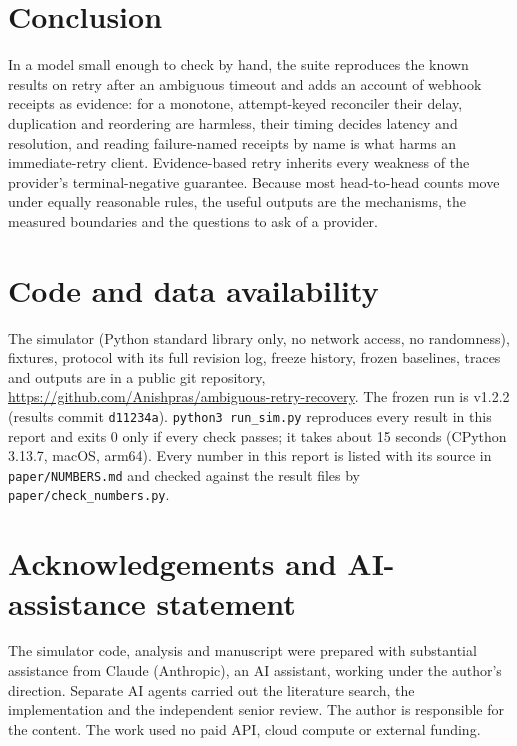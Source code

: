 \documentclass[11pt]{article}
\newcommand{\code}[1]{\texttt{#1}}
\begin{document}
\section{Conclusion}\label{sec:conclusion}

In a model small enough to check by hand, the suite reproduces the known results on retry after an ambiguous timeout and adds an account of webhook receipts as evidence: for a monotone, attempt-keyed reconciler their delay, duplication and reordering are harmless, their timing decides latency and resolution, and reading failure-named receipts by name is what harms an immediate-retry client. Evidence-based retry inherits every weakness of the provider's terminal-negative guarantee. Because most head-to-head counts move under equally reasonable rules, the useful outputs are the mechanisms, the measured boundaries and the questions to ask of a provider.

\section*{Code and data availability}

The simulator (Python standard library only, no network access, no randomness), fixtures, protocol with its full revision log, freeze history, frozen baselines, traces and outputs are in a public git repository, \url{https://github.com/Anishpras/ambiguous-retry-recovery}. The frozen run is v1.2.2 (results commit \code{d11234a}). \code{python3 run\_sim.py} reproduces every result in this report and exits 0 only if every check passes; it takes about 15 seconds (CPython 3.13.7, macOS, arm64). Every number in this report is listed with its source in \code{paper/NUMBERS.md} and checked against the result files by \code{paper/check\_numbers.py}.

\section*{Acknowledgements and AI-assistance statement}

The simulator code, analysis and manuscript were prepared with substantial assistance from Claude (Anthropic), an AI assistant, working under the author's direction. Separate AI agents carried out the literature search, the implementation and the independent senior review. The author is responsible for the content. The work used no paid API, cloud compute or external funding.
\end{document}
